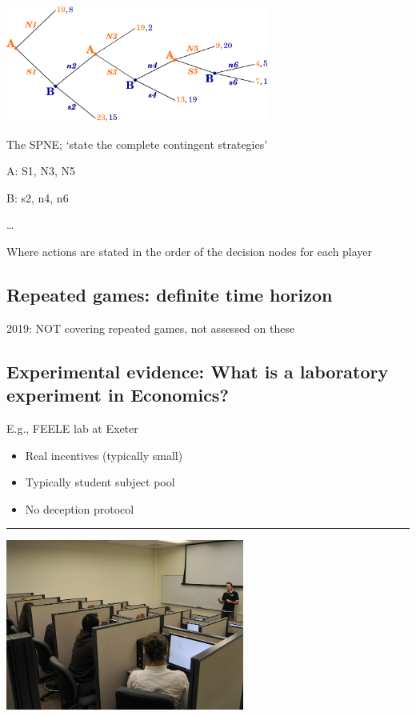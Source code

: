 \documentclass[]{article}
\providecommand{\tightlist}{%
  \setlength{\itemsep}{0pt}\setlength{\parskip}{0pt}}
\begin{document}
\includegraphics[height=1.5in]{picsfigs/longgamework_randompayoffs_ul.png}

The SPNE; `state the complete contingent strategies'

A: S1, N3, N5

B: s2, n4, n6

\bigskip

\ldots{}

Where actions are stated in the order of the decision nodes for each player

\hypertarget{repeated-games-definite-time-horizon}{%
\subsection{Repeated games: definite time horizon}\label{repeated-games-definite-time-horizon}}

2019: NOT covering repeated games, not assessed on these

\hypertarget{experimental-evidence-what-is-a-laboratory-experiment-in-economics}{%
\subsection{Experimental evidence: What is a laboratory experiment in Economics?}\label{experimental-evidence-what-is-a-laboratory-experiment-in-economics}}

E.g., FEELE lab at Exeter

\begin{itemize}
\tightlist
\item
  Real incentives (typically small)
\item
  Typically student subject pool
\item
  No deception protocol
\end{itemize}

\begin{center}\rule{0.5\linewidth}{\linethickness}\end{center}

\includegraphics[height=2.2in]{picsfigs/expeconlab.jpg}
\end{document}
